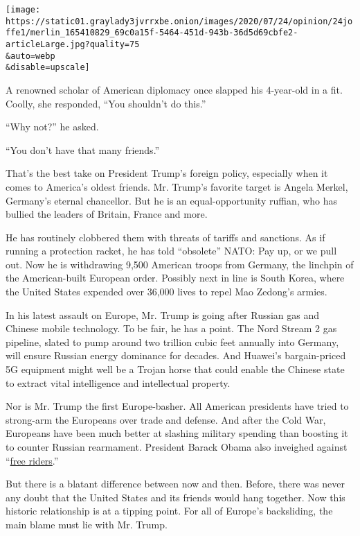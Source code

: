 \texttt{[image: https://static01.graylady3jvrrxbe.onion/images/2020/07/24/opinion/24joffe1/merlin\_165410829\_69c0a15f-5464-451d-943b-36d5d69cbfe2-articleLarge.jpg?quality=75\\\&auto=webp\\\&disable=upscale]}

A renowned scholar of American diplomacy once slapped his 4-year-old in
a fit. Coolly, she responded, ``You shouldn't do this.''

``Why not?'' he asked.

``You don't have that many friends.''

That's the best take on President Trump's foreign policy, especially
when it comes to America's oldest friends. Mr. Trump's favorite target
is Angela Merkel, Germany's eternal chancellor. But he is an
equal-opportunity ruffian, who has bullied the leaders of Britain,
France and more.

He has routinely clobbered them with threats of tariffs and sanctions.
As if running a protection racket, he has told ``obsolete'' NATO: Pay
up, or we pull out. Now he is withdrawing 9,500 American troops from
Germany, the linchpin of the American-built European order. Possibly
next in line is South Korea, where the United States expended over
36,000 lives to repel Mao Zedong's armies.

In his latest assault on Europe, Mr. Trump is going after Russian gas
and Chinese mobile technology. To be fair, he has a point. The Nord
Stream 2 gas pipeline, slated to pump around two trillion cubic feet
annually into Germany, will ensure Russian energy dominance for decades.
And Huawei's bargain-priced 5G equipment might well be a Trojan horse
that could enable the Chinese state to extract vital intelligence and
intellectual property.

Nor is Mr. Trump the first Europe-basher. All American presidents have
tried to strong-arm the Europeans over trade and defense. And after the
Cold War, Europeans have been much better at slashing military spending
than boosting it to counter Russian rearmament. President Barack Obama
also inveighed against
``\href{https://www.nytimes3xbfgragh.onion/2016/03/10/world/middleeast/obama-criticizes-the-free-riders-among-americas-allies.html}{free
riders}.''

But there is a blatant difference between now and then. Before, there
was never any doubt that the United States and its friends would hang
together. Now this historic relationship is at a tipping point. For all
of Europe's backsliding, the main blame must lie with Mr. Trump.

